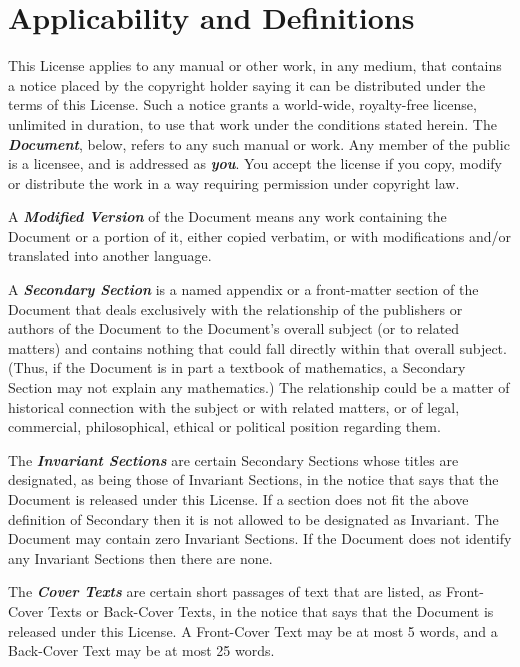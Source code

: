 \section{Applicability and Definitions}
\label{sec:appl-defin}

This License applies to any manual or other work, in any medium, that
contains a notice placed by the copyright holder saying it can be
distributed under the terms of this License.  Such a notice grants a
world-wide, royalty-free license, unlimited in duration, to use that
work under the conditions stated herein.  The
\emph{\textbf{Document}}, below, refers to any such manual or work.
Any member of the public is a licensee, and is addressed as
\emph{\textbf{you}}.  You accept the license if you copy, modify or
distribute the work in a way requiring permission under copyright law.

A \emph{\textbf{Modified Version}} of the Document means any work
containing the Document or a portion of it, either copied verbatim, or
with modifications and/or translated into another language.

A \emph{\textbf{Secondary Section}} is a named appendix or a
front-matter section of the Document that deals exclusively with the
relationship of the publishers or authors of the Document to the
Document's overall subject (or to related matters) and contains
nothing that could fall directly within that overall subject.  (Thus,
if the Document is in part a textbook of mathematics, a Secondary
Section may not explain any mathematics.)  The relationship could be a
matter of historical connection with the subject or with related
matters, or of legal, commercial, philosophical, ethical or political
position regarding them.

The \emph{\textbf{Invariant Sections}} are certain Secondary Sections
whose titles are designated, as being those of Invariant Sections, in
the notice that says that the Document is released under this License.
If a section does not fit the above definition of Secondary then it is
not allowed to be designated as Invariant.  The Document may contain
zero Invariant Sections.  If the Document does not identify any
Invariant Sections then there are none.

The \emph{\textbf{Cover Texts}} are certain short passages of text
that are listed, as Front-Cover Texts or Back-Cover Texts, in the
notice that says that the Document is released under this License.  A
Front-Cover Text may be at most 5 words, and a Back-Cover Text may be
at most 25 words.

